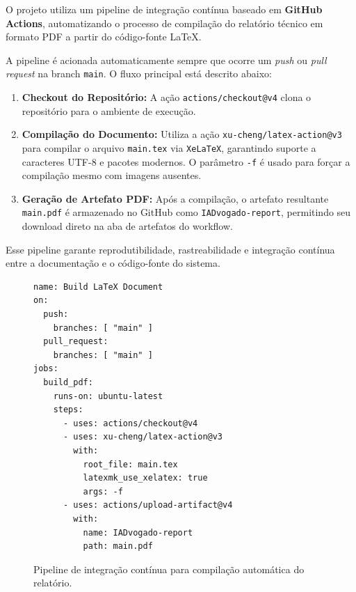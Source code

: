 \documentclass{article}
\begin{document}
O projeto utiliza um pipeline de integração contínua baseado em \textbf{GitHub Actions}, automatizando o processo de compilação do relatório técnico em formato PDF a partir do código-fonte \LaTeX.

A pipeline é acionada automaticamente sempre que ocorre um \textit{push} ou \textit{pull request} na branch \texttt{main}. O fluxo principal está descrito abaixo:

\begin{enumerate}
  \item \textbf{Checkout do Repositório:} A ação \texttt{actions/checkout@v4} clona o repositório para o ambiente de execução.
  \item \textbf{Compilação do Documento:} Utiliza a ação \texttt{xu-cheng/latex-action@v3} para compilar o arquivo \texttt{main.tex} via \texttt{XeLaTeX}, garantindo suporte a caracteres UTF-8 e pacotes modernos. O parâmetro \texttt{-f} é usado para forçar a compilação mesmo com imagens ausentes.
  \item \textbf{Geração de Artefato PDF:} Após a compilação, o artefato resultante \texttt{main.pdf} é armazenado no GitHub como \texttt{IADvogado-report}, permitindo seu download direto na aba de artefatos do workflow.
\end{enumerate}

Esse pipeline garante reprodutibilidade, rastreabilidade e integração contínua entre a documentação e o código-fonte do sistema.

\begin{figure}[H]
\centering
\begin{verbatim}
name: Build LaTeX Document
on:
  push:
    branches: [ "main" ]
  pull_request:
    branches: [ "main" ]
jobs:
  build_pdf:
    runs-on: ubuntu-latest
    steps:
      - uses: actions/checkout@v4
      - uses: xu-cheng/latex-action@v3
        with:
          root_file: main.tex
          latexmk_use_xelatex: true
          args: -f
      - uses: actions/upload-artifact@v4
        with:
          name: IADvogado-report
          path: main.pdf
\end{verbatim}
\caption{Pipeline de integração contínua para compilação automática do relatório.}
\end{figure}


\newpage
\end{document}
